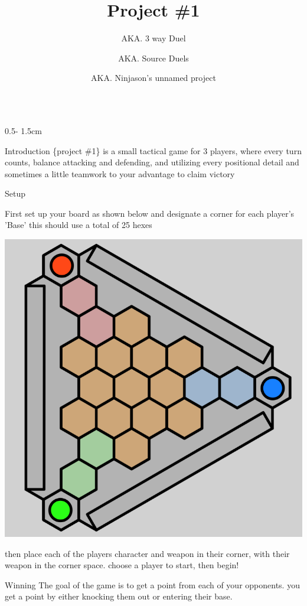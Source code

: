 \documentclass{uioposter}
\title{Project \#1}
\author
{%
    AKA. 3 way Duel
    \and
    AKA. Source Duels
    \and
    AKA. Ninjason's unnamed project
}
\institute
{
    3 Players
    \and
    5-10 minutes
    \and
    ages 10?+ idk
}
\begin{document}
\begin{frame}
\begin{columns}[onlytextwidth]


\begin{column}{0.5\textwidth - 1.5cm}

    \begin{block}{Introduction}
        \{project \#1\} is a small tactical game for 3 players, where every turn counts, balance attacking and defending, and utilizing every positional detail and sometimes a little teamwork to your advantage to claim victory
    \end{block}

    \begin{block}{Setup}
        \raggedright
        First set up your board as shown below and designate a corner for each player's 'Base' this should use a total of 25 hexes
        \begin{center}
            \includegraphics[]{Img/3DuelBoard.png}
        \end{center}
        then place each of the players character and weapon in their corner, with their weapon in the corner space. choose a player to start, then begin!
    \end{block}

    \begin{block}{Winning}
        The goal of the game is to get a point from each of your opponents. you get a point by either knocking them out or entering their base.
    \end{block}


\end{column}
\end{columns}
\end{frame}
\end{document}
